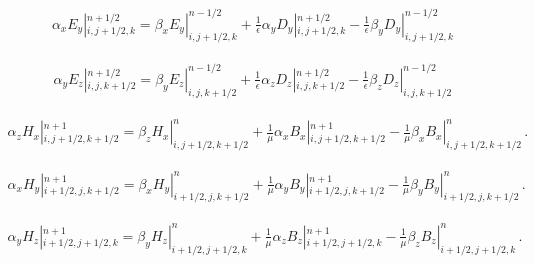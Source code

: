 \documentclass[a4paper,10pt]{article}
\begin{document}
\begin{align}
\alpha_x E_y |_{i,j+1/2,k}^{n+1/2} =
\beta_x  E_y |_{i,j+1/2,k}^{n-1/2} +
\frac{1}{\epsilon} \alpha_y  D_y |_{i,j+1/2,k}^{n+1/2}  -
\frac{1}{\epsilon} \beta_y  D_y |_{i,j+1/2,k}^{n-1/2}\,
\end{align}

\begin{align}
\alpha_y E_z |_{i,j,k+1/2}^{n+1/2} =
\beta_y E_z |_{i,j,k+1/2}^{n-1/2}  +
\frac{1}{\epsilon} \alpha_z  D_z |_{i,j,k+1/2}^{n+1/2}  -
\frac{1}{\epsilon} \beta_z  D_z |_{i,j,k+1/2}^{n-1/2}\,
\end{align}

\begin{align}
\alpha_z H_x |_{i,j+1/2,k+1/2}^{n+1} = 
\beta_z H_x |_{i,j+1/2,k+1/2}^{n}   +
\frac{1}{\mu} \alpha_x B_x |_{i,j+1/2,k+1/2}^{n+1}  -
\frac{1}{\mu} \beta_x B_x |_{i,j+1/2,k+1/2}^{n}\,.
\end{align}

\begin{align}
\alpha_x H_y |_{i+1/2,j,k+1/2}^{n+1} = 
\beta_x H_y |_{i+1/2,j,k+1/2}^{n} +
\frac{1}{\mu} \alpha_y B_y |_{i+1/2,j,k+1/2}^{n+1}  -
\frac{1}{\mu} \beta_y B_y |_{i+1/2,j,k+1/2}^{n}\,.
\end{align}

\begin{align}
\alpha_y H_z |_{i+1/2,j+1/2,k}^{n+1} = 
\beta_y H_z |_{i+1/2,j+1/2,k}^{n} +
\frac{1}{\mu} \alpha_z B_z |_{i+1/2,j+1/2,k}^{n+1}  -
\frac{1}{\mu} \beta_z B_z |_{i+1/2,j+1/2,k}^{n}\,.
\end{align}
\end{document}
